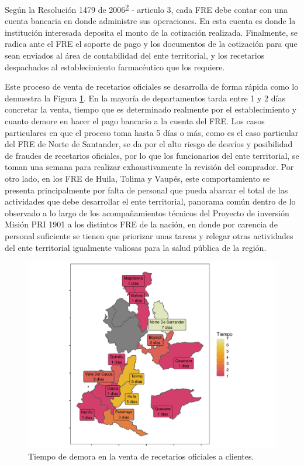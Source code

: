 \documentclass[
  oneside]{book}
\begin{document}
Según la Resolución 1479 de 2006\textsuperscript{\protect\hyperlink{ref-MSPS1479-2006}{2}} - articulo 3, cada FRE debe contar con una cuenta bancaria en donde administre sus operaciones. En esta cuenta es donde la institución interesada deposita el monto de la cotización realizada. Finalmente, se radica ante el FRE el soporte de pago y los documentos de la cotización para que sean enviados al área de contabilidad del ente territorial, y los recetarios despachados al establecimiento farmacéutico que los requiere.

Este proceso de venta de recetarios oficiales se desarrolla de forma rápida como lo demuestra la Figura \ref{fig:TiempoVentaInstituciones}. En la mayoría de departamentos tarda entre 1 y 2 días concretar la venta, tiempo que es determinado realmente por el establecimiento y cuanto demore en hacer el pago bancario a la cuenta del FRE. Los casos particulares en que el proceso toma hasta 5 días o más, como es el caso particular del FRE de Norte de Santander, se da por el alto riesgo de desvíos y posibilidad de fraudes de recetarios oficiales, por lo que los funcionarios del ente territorial, se toman una semana para realizar exhaustivamente la revisión del comprador. Por otro lado, en los FRE de Huila, Tolima y Vaupés, este comportamiento se presenta principalmente por falta de personal que pueda abarcar el total de las actividades que debe desarrollar el ente territorial, panorama común dentro de lo observado a lo largo de los acompañamientos técnicos del Proyecto de inversión Misión PRI 1901 a los distintos FRE de la nación, en donde por carencia de personal suficiente se tienen que priorizar unas tareas y relegar otras actividades del ente territorial igualmente valiosas para la salud pública de la región.

\begin{figure}

{\centering \includegraphics[width=0.9\linewidth]{InformeFinal_files/figure-latex/TiempoVentaInstituciones-1} 

}

\caption{Tiempo de demora en la venta de recetarios oficiales a clientes.}\label{fig:TiempoVentaInstituciones}
\end{figure}
\end{document}
